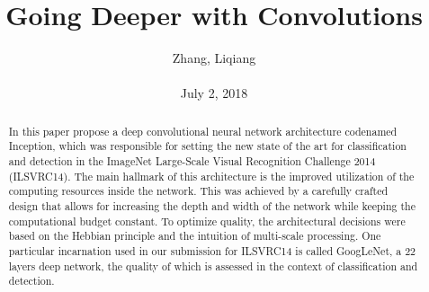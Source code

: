 \documentclass[10pt,twocolumn,letterpaper]{article}
\title{\textbf{Going Deeper with Convolutions}}
\author{Zhang, Liqiang\\\\July 2, 2018}
\begin{document}
\maketitle
\par
\begin{abstract}
In this paper propose a deep convolutional neural network architecture codenamed Inception, which was responsible for setting the new state of the art for classification and detection in the ImageNet Large-Scale Visual Recognition Challenge 2014 (ILSVRC14). The main hallmark of this architecture is the improved utilization of the computing resources inside the network. This was achieved by a carefully crafted design that allows for increasing the depth and width of the network while keeping the computational budget constant. To optimize quality, the architectural decisions were based on the Hebbian principle and the intuition of multi-scale processing. One particular incarnation used in our submission for ILSVRC14 is called GoogLeNet, a 22 layers deep network, the quality of which is assessed in the context of classification and detection.
\end{abstract}
\end{document}

